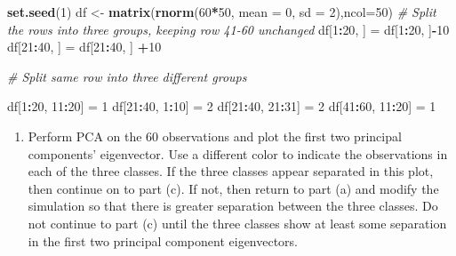 \documentclass[]{article}
\newenvironment{Shaded}{\begin{snugshade}}{\end{snugshade}}
\newcommand{\KeywordTok}[1]{\textcolor[rgb]{0.13,0.29,0.53}{\textbf{#1}}}
\newcommand{\DataTypeTok}[1]{\textcolor[rgb]{0.13,0.29,0.53}{#1}}
\newcommand{\DecValTok}[1]{\textcolor[rgb]{0.00,0.00,0.81}{#1}}
\newcommand{\StringTok}[1]{\textcolor[rgb]{0.31,0.60,0.02}{#1}}
\newcommand{\CommentTok}[1]{\textcolor[rgb]{0.56,0.35,0.01}{\textit{#1}}}
\newcommand{\OperatorTok}[1]{\textcolor[rgb]{0.81,0.36,0.00}{\textbf{#1}}}
\newcommand{\NormalTok}[1]{#1}
\providecommand{\tightlist}{%
  \setlength{\itemsep}{0pt}\setlength{\parskip}{0pt}}
\begin{document}
\begin{Shaded}
\begin{Highlighting}[]
\KeywordTok{set.seed}\NormalTok{(}\DecValTok{1}\NormalTok{)}
\NormalTok{df <-}\StringTok{ }\KeywordTok{matrix}\NormalTok{(}\KeywordTok{rnorm}\NormalTok{(}\DecValTok{60}\OperatorTok{*}\DecValTok{50}\NormalTok{, }\DataTypeTok{mean =} \DecValTok{0}\NormalTok{, }\DataTypeTok{sd =} \DecValTok{2}\NormalTok{),}\DataTypeTok{ncol=}\DecValTok{50}\NormalTok{)}
\CommentTok{# Split the rows into three groups, keeping row 41-60 unchanged}
\NormalTok{df[}\DecValTok{1}\OperatorTok{:}\DecValTok{20}\NormalTok{, ] =}\StringTok{ }\NormalTok{df[}\DecValTok{1}\OperatorTok{:}\DecValTok{20}\NormalTok{, ]}\OperatorTok{-}\DecValTok{10}
\NormalTok{df[}\DecValTok{21}\OperatorTok{:}\DecValTok{40}\NormalTok{, ] =}\StringTok{ }\NormalTok{df[}\DecValTok{21}\OperatorTok{:}\DecValTok{40}\NormalTok{, ] }\OperatorTok{+}\DecValTok{10}

\CommentTok{# Split same row into three different groups}

\NormalTok{df[}\DecValTok{1}\OperatorTok{:}\DecValTok{20}\NormalTok{, }\DecValTok{11}\OperatorTok{:}\DecValTok{20}\NormalTok{] =}\StringTok{ }\DecValTok{1}
\NormalTok{df[}\DecValTok{21}\OperatorTok{:}\DecValTok{40}\NormalTok{, }\DecValTok{1}\OperatorTok{:}\DecValTok{10}\NormalTok{] =}\StringTok{ }\DecValTok{2}
\NormalTok{df[}\DecValTok{21}\OperatorTok{:}\DecValTok{40}\NormalTok{, }\DecValTok{21}\OperatorTok{:}\DecValTok{31}\NormalTok{] =}\StringTok{ }\DecValTok{2}
\NormalTok{df[}\DecValTok{41}\OperatorTok{:}\DecValTok{60}\NormalTok{, }\DecValTok{11}\OperatorTok{:}\DecValTok{20}\NormalTok{] =}\StringTok{ }\DecValTok{1}
\end{Highlighting}
\end{Shaded}

\begin{enumerate}
\def\labelenumi{(\alph{enumi})}
\setcounter{enumi}{1}
\tightlist
\item
  Perform PCA on the 60 observations and plot the first two principal
  components' eigenvector. Use a different color to indicate the
  observations in each of the three classes. If the three classes appear
  separated in this plot, then continue on to part (c). If not, then
  return to part (a) and modify the simulation so that there is greater
  separation between the three classes. Do not continue to part (c)
  until the three classes show at least some separation in the first two
  principal component eigenvectors.
\end{enumerate}
\end{document}
